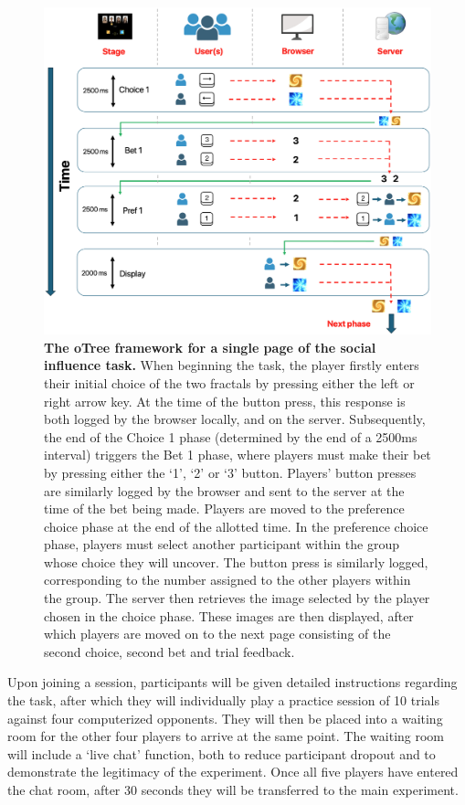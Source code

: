 \documentclass[12pt,a4paper,oneside,]{book} %
\begin{document}
\begin{figure}
\includegraphics[width=1\linewidth]{figures/otree_flowchart} \caption{{\textbf{The oTree framework for a single page of the social influence task.} When beginning the task, the player firstly enters their initial choice of the two fractals by pressing either the left or right arrow key. At the time of the button press, this response is both logged by the browser locally, and on the server. Subsequently, the end of the Choice 1 phase (determined by the end of a 2500ms interval) triggers the Bet 1 phase, where players must make their bet by pressing either the `1', `2' or `3' button. Players' button presses are similarly logged by the browser and sent to the server at the time of the bet being made. Players are moved to the preference choice phase at the end of the allotted time. In the preference choice phase, players must select another participant within the group whose choice they will uncover. The button press is similarly logged, corresponding to the number assigned to the other players within the group. The server then retrieves the image selected by the player chosen in the choice phase. These images are then displayed, after which players are moved on to the next page consisting of the second choice, second bet and trial feedback.}}\label{fig:figure-1-otree}
\end{figure}



Upon joining a session, participants will be given detailed instructions regarding the task, after which they will individually play a practice session of 10 trials against four computerized opponents. They will then be placed into a waiting room for the other four players to arrive at the same point. The waiting room will include a `live chat' function, both to reduce participant dropout and to demonstrate the legitimacy of the experiment. Once all five players have entered the chat room, after 30 seconds they will be transferred to the main experiment.
\end{document}
